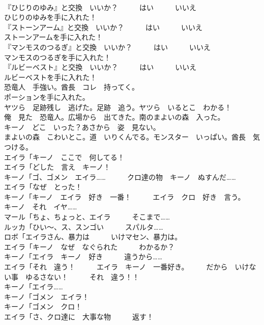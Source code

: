 \documentclass[8pt]{extreport}
\begin{document}
\begin{CJK}{UTF8}{min}
\\	『ひじりのゆみ』と交換　いいか？　　　はい　　　いいえ	
\\	ひじりのゆみを手に入れた！	
\\	『ストーンアーム』と交換　いいか？　　　はい　　　いいえ	
\\	ストーンアームを手に入れた！	
\\	『マンモスのつるぎ』と交換　いいか？　　　はい　　　いいえ	
\\	マンモスのつるぎを手に入れた！	
\\	『ルビーベスト』と交換　いいか？　　　はい　　　いいえ	
\\	ルビーベストを手に入れた！	
\\	恐竜人　手強い。酋長　コレ　持ってく。	
\\	ポーションを手に入れた。	
\\	ヤツら　足跡残し　逃げた。足跡　追う。ヤツら　いるとこ　わかる！ 
\\	俺　見た　恐竜人。広場から　出てきた。南のまよいの森　入った。	
\\	キーノ　どこ　いった？あさから　姿　見ない。	
\\	まよいの森　こわいとこ。道　いりくんでる。モンスター　いっぱい。酋長　気　つける。	
\\	エイラ「キーノ　ここで　何してる！	
\\	エイラ「どした　言え　キーノ！	
\\	キーノ「ゴ、ゴメン　エイラ……　　　クロ達の物　キーノ　ぬすんだ……	
\\	エイラ「なぜ　とった！	
\\	キーノ「キーノ　エイラ　好き　一番！　　　エイラ　クロ　好き　言う。　　　キーノ　それ　イヤ……	
\\	マール「ちょ、ちょっと、エイラ　　　そこまで……	
\\	ルッカ「ひい～、ス、スンゴい　　　スパルタ……	
\\	ロボ「エイラさん、暴力は　　　いけマセン、暴力は。	
\\	エイラ「キーノ　なぜ　なぐられた　　　わかるか？	
\\	キーノ「エイラ　キーノ　好き　　　違うから……	
\\	エイラ「それ　違う！　　　エイラ　キーノ　一番好き。　　　だから　いけない事　ゆるさない！　　　それ　違う！！	
\\	キーノ「エイラ……	
\\	キーノ「ゴメン　エイラ！	
\\	キーノ「ゴメン　クロ！	
\\	エイラ「さ、クロ達に　大事な物　　　返す！	

\end{CJK}
\end{document}
